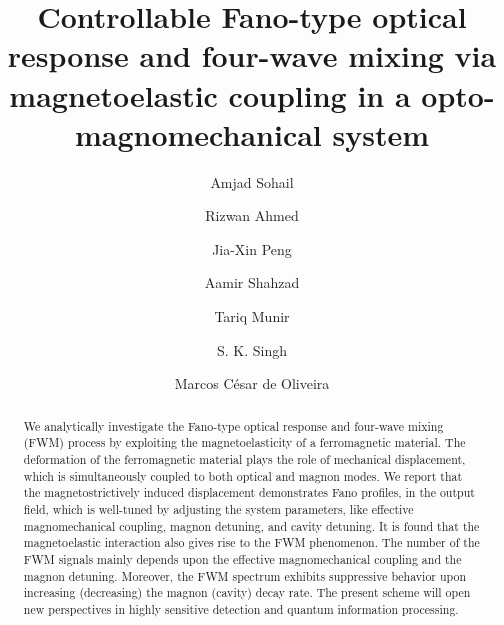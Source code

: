 \documentclass[aps,pra,superscriptaddress,balancelastpage,twocolumn]{revtex4}
\begin{document}
\title{Controllable Fano-type optical response and four-wave mixing via
magnetoelastic coupling in a opto-magnomechanical system}
\author{Amjad Sohail}
\author{Rizwan Ahmed}
\author{Jia-Xin Peng}
\author{Aamir Shahzad}
\author{Tariq Munir}
\author{S. K. Singh}
\author{Marcos C\'{e}sar de Oliveira}

\begin{abstract}
We analytically investigate the Fano-type optical response and four-wave mixing (FWM) process by exploiting the magnetoelasticity of a ferromagnetic material. The deformation of the ferromagnetic material plays the role of mechanical displacement, which is simultaneously coupled to both optical and magnon modes. We report that the
magnetostrictively induced displacement demonstrates Fano profiles, in the output field, which is well-tuned by adjusting the system parameters, like effective magnomechanical coupling, magnon detuning, and cavity detuning. It is found that the magnetoelastic interaction also gives rise to the FWM phenomenon. The number of the FWM
signals mainly depends upon the effective magnomechanical coupling and the magnon detuning. Moreover, the FWM spectrum exhibits suppressive behavior upon increasing (decreasing) the magnon (cavity) decay rate. The present scheme will open new perspectives in highly sensitive detection and quantum information processing.
\end{abstract}
\end{document}
